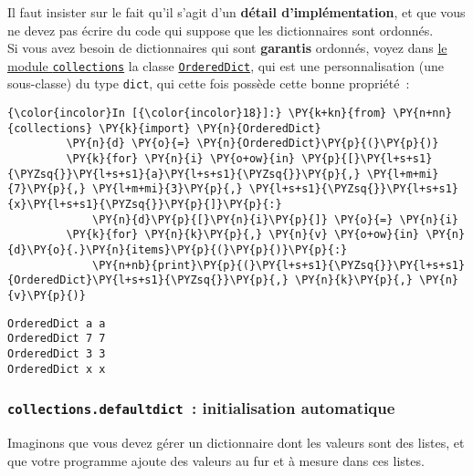     Il faut insister sur le fait qu'il s'agit d'un \textbf{détail
d'implémentation}, et que vous ne devez pas écrire du code qui suppose
que les dictionnaires sont ordonnés.\\

    Si vous avez besoin de dictionnaires qui sont \textbf{garantis}
ordonnés, voyez dans
\href{https://docs.python.org/3/library/collections.html}{le module
\texttt{collections}} la classe
\href{https://docs.python.org/3/library/collections.html\#collections.OrderedDict}{\texttt{OrderedDict}},
qui est une personnalisation (une sous-classe) du type \texttt{dict},
qui cette fois possède cette bonne propriété~:

    \begin{Verbatim}[commandchars=\\\{\}]
{\color{incolor}In [{\color{incolor}18}]:} \PY{k+kn}{from} \PY{n+nn}{collections} \PY{k}{import} \PY{n}{OrderedDict}
         \PY{n}{d} \PY{o}{=} \PY{n}{OrderedDict}\PY{p}{(}\PY{p}{)}
         \PY{k}{for} \PY{n}{i} \PY{o+ow}{in} \PY{p}{[}\PY{l+s+s1}{\PYZsq{}}\PY{l+s+s1}{a}\PY{l+s+s1}{\PYZsq{}}\PY{p}{,} \PY{l+m+mi}{7}\PY{p}{,} \PY{l+m+mi}{3}\PY{p}{,} \PY{l+s+s1}{\PYZsq{}}\PY{l+s+s1}{x}\PY{l+s+s1}{\PYZsq{}}\PY{p}{]}\PY{p}{:}
             \PY{n}{d}\PY{p}{[}\PY{n}{i}\PY{p}{]} \PY{o}{=} \PY{n}{i}
         \PY{k}{for} \PY{n}{k}\PY{p}{,} \PY{n}{v} \PY{o+ow}{in} \PY{n}{d}\PY{o}{.}\PY{n}{items}\PY{p}{(}\PY{p}{)}\PY{p}{:}
             \PY{n+nb}{print}\PY{p}{(}\PY{l+s+s1}{\PYZsq{}}\PY{l+s+s1}{OrderedDict}\PY{l+s+s1}{\PYZsq{}}\PY{p}{,} \PY{n}{k}\PY{p}{,} \PY{n}{v}\PY{p}{)}
\end{Verbatim}


    \begin{Verbatim}[commandchars=\\\{\}]
OrderedDict a a
OrderedDict 7 7
OrderedDict 3 3
OrderedDict x x

    \end{Verbatim}

    \hypertarget{collections.defaultdict-initialisation-automatique}{%
\subsubsection{\texorpdfstring{\texttt{collections.defaultdict}~:
initialisation
automatique}{collections.defaultdict~: initialisation automatique}}\label{collections.defaultdict-initialisation-automatique}}

    Imaginons que vous devez gérer un dictionnaire dont les valeurs sont des
listes, et que votre programme ajoute des valeurs au fur et à mesure
dans ces listes.\\

